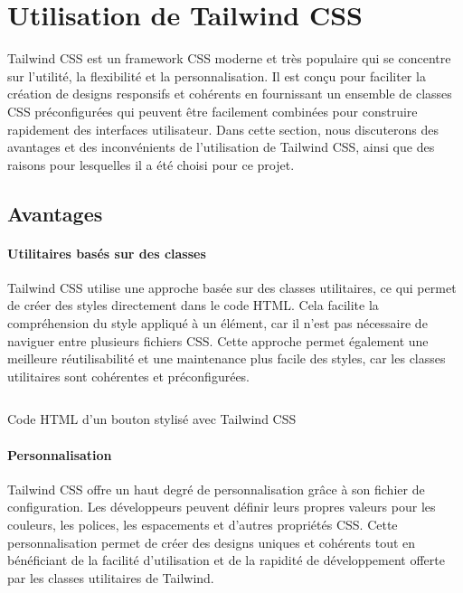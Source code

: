 \section{Utilisation de Tailwind CSS}

Tailwind CSS\cite{InstallationTailwindCSS} est un framework CSS moderne et très populaire qui se concentre sur l'utilité, la flexibilité et la personnalisation. Il est conçu pour faciliter la création de designs responsifs et cohérents en fournissant un ensemble de classes CSS préconfigurées qui peuvent être facilement combinées pour construire rapidement des interfaces utilisateur. Dans cette section, nous discuterons des avantages et des inconvénients de l'utilisation de Tailwind CSS, ainsi que des raisons pour lesquelles il a été choisi pour ce projet.

\subsection{Avantages}

\paragraph{Utilitaires basés sur des classes}

Tailwind CSS utilise une approche basée sur des classes utilitaires, ce qui permet de créer des styles directement dans le code HTML. Cela facilite la compréhension du style appliqué à un élément, car il n'est pas nécessaire de naviguer entre plusieurs fichiers CSS. Cette approche permet également une meilleure réutilisabilité et une maintenance plus facile des styles, car les classes utilitaires sont cohérentes et préconfigurées.

\begin{listing}[H]
    \inputminted{HTML}{assets/code/tailwind-example.html}
    \caption{Code HTML d'un bouton stylisé avec Tailwind CSS\label{fig:tailwind-example}}
\end{listing}

\paragraph{Personnalisation}

Tailwind CSS offre un haut degré de personnalisation grâce à son fichier de configuration. Les développeurs peuvent définir leurs propres valeurs pour les couleurs, les polices, les espacements et d'autres propriétés CSS. Cette personnalisation permet de créer des designs uniques et cohérents tout en bénéficiant de la facilité d'utilisation et de la rapidité de développement offerte par les classes utilitaires de Tailwind.

